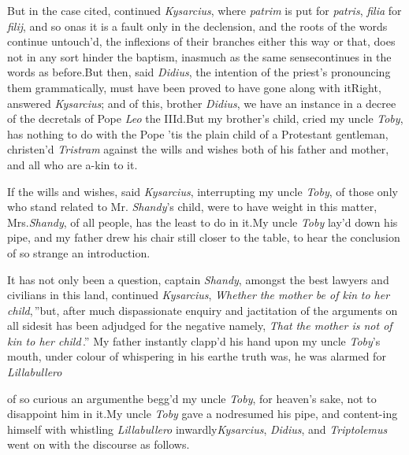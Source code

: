 \documentclass{article}
\begin{document}
But in the case cited, continued \textit{Kysarcius}, where
\textit{patrim} is put for \textit{patris}, \textit{filia}
for \textit{filij}, and so on\tsk as it is a fault only in
the declension, and the roots of the words continue
untouch’d, the inflexions of their branches either this way
or that, does not in any sort hinder the baptism,
inasmuch as the same sense\break continues in the words as
before.\tsk But then, said \textit{Didius}, the intention of
the priest’s pronouncing them grammatically, must have been
proved to have gone along with it\tsk Right, answered
\textit{Kysarcius}; and of this, brother \textit{Didius}, we
have an instance in a decree of the decretals of Pope
\textit{Leo} the IIId.\tsk But my brother’s child, cried my
uncle \textit{Toby}, has nothing to do with the Pope\tsk
’tis the plain child of a Protestant gentleman, christen’d
\textit{Tristram} against the wills and wishes both of his
father and mother, and all who are a-kin to it.\tsk

If the wills and wishes, said \textit{Kysarcius}, interrupting my
uncle \textit{Toby}, of those only who stand related to Mr.
\textit{Shandy}’s child, were to have weight in this matter,
Mrs.\@ \textit{Shandy}, of all people, has the least to do in
it.\tsk My uncle \textit{Toby} lay’d down his pipe, and my father drew his chair still closer to
the table, to hear the conclusion of so strange an
introduction.

It has not only been a question, captain \textit{Shandy}, amongst the
\lower-3pt\hbox{\ast} best lawyers and civilians in this land,
continued \textit{Kys\-arcius}, \lqq\textit{Whether the
mother be of kin}\break
\lqq \textit{to her child},\,”\tsk but, after much
dispas\-sionate enquiry and jactitation of the arguments on
all sides\tsk it has been adjudged for the negative\tsk
namely, \lqq\textit{That}\break
\lqq \textit{the mother is not of kin to her child}\,\dagger.”\break
My father instantly clapp’d his hand\break
upon my uncle \textit{Toby}’s mouth, under co\-lour of whispering in his
ear\tsk the truth\break
was, he was alarmed for \textit{Lillabullero}\tsk\break
{}\break
{}
\vskip 2pt
\vskip -3pt

\newpage\noindent
of so curious an argument\tsk he begg’d my
uncle \textit{Toby}, for heaven’s sake, not to disappoint him in it.\tsk My uncle
\textit{Toby} gave a nod\tsk resumed his pipe, and
content-\break ing himself with whistling
\textit{Lillabullero}\break
inwardly\tsh \textit{Kysarcius}, \textit{Didius}, and
\textit{Triptolemus} went on with the discourse as follows.
\end{document}
